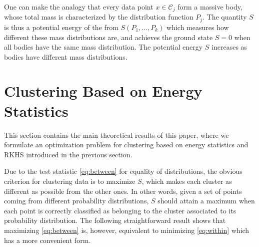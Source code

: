 \documentclass[aps,preprint,nofootinbib,floatfix]{revtex4-1}
\newcommand\C{{\mathcal{C}}}
\begin{document}
One can make the analogy 
that every data point $ x \in \C_j$ form a massive body, 
whose total mass is characterized by the distribution function $P_j$.
The quantity $S$ is thus a potential
energy of the from $S(P_1,\dotsc,P_k)$ which measures how different
these
mass distributions are, and achieves the ground state
$S=0$ when all bodies have the same mass distribution. The potential energy
$S$ increases as bodies have different mass distributions.



\section{Clustering Based on Energy Statistics}
\label{sec:clustering_theory}

This section contains the main theoretical results of this paper, where 
we formulate an optimization problem for clustering 
based on energy statistics and RKHS introduced in the previous section.

Due to the test statistic \eqref{eq:between} for equality of distributions,
the obvious
criterion for clustering data is to 
maximize $S$, which makes 
each cluster as different
as possible from the other ones.
In other words, given a set of points coming from different probability
distributions, $S$ should attain a maximum when each point is correctly
classified as belonging to the cluster associated to its probability
distribution.
The following 
straightforward result
shows that maximizing \eqref{eq:between} is, however, equivalent to minimizing
\eqref{eq:within} which has a more convenient form.
\end{document}
